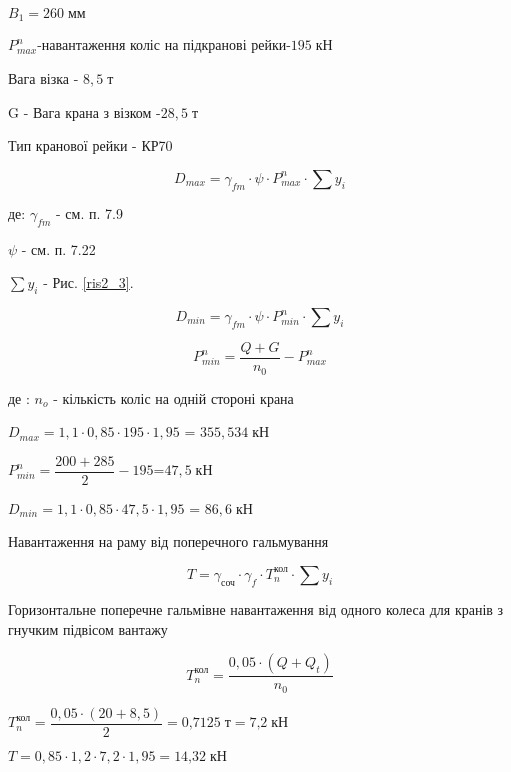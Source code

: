 \documentclass[a4paper,14pt]{article}
\begin{document}
$B_1=260\;\textit{мм}$

$P^n_{max}$-навантаження коліс на підкранові рейки-$195\;\textit{кН}$

Вага візка - $8,5\;\textit{т}$

G - Вага крана з візком -$28,5\;\textit{т}$

Тип кранової рейки - КР70



\begin{equation}
    D_{max}=\gamma_{fm}\cdot \psi \cdot P^n_{max} \cdot \sum y_i
\end{equation}

де: $\gamma_{fm}$ - см. п. 7.9 %

$\psi$ - см. п. 7.22 %

$\sum y_i$ - Рис. \ref{ris2_3}.

\begin{equation}
    D_{min}=\gamma_{fm}\cdot \psi \cdot P^n_{min} \cdot \sum y_i
\end{equation}

\begin{equation}
P^n_{min} = \dfrac {Q+G}{n_0}-P^n_{max}
\end{equation}

де : $n_o$ - кількість коліс на одній стороні крана

$D_{max}=1,1\cdot 0,85 \cdot 195 \cdot 1,95$ = $355,534\;\textit{кН}$

$P^n_{min} = \dfrac {200+285}{2}-195$=$47,5\;\textit{кН}$

$D_{min}=1,1\cdot 0,85 \cdot 47,5 \cdot 1,95$ = $86,6\;\textit{кН}$

Навантаження на раму від поперечного гальмування

\begin{equation}
    T=\gamma_\textit{соч}\cdot \gamma_f \cdot T^\textit{кол}_{n} \cdot \sum y_i
\end{equation}

Горизонтальне поперечне гальмівне навантаження від одного колеса 
   для кранів з гнучким підвісом вантажу 

\begin{equation}
    T^\textit{кол}_{n}=\dfrac {0,05\cdot (Q+Q_t)}{n_0}
\end{equation}

$T^\textit{кол}_{n}=\dfrac {0,05\cdot (20+8,5)}{2}=\textit{0,7125}\;\textit{т}=\textit{7,2}\;\textit{кН}$

$T=0,85\cdot 1,2 \cdot 7,2 \cdot 1,95 = \textit{14,32}\;\textit{кН}$
\end{document}
